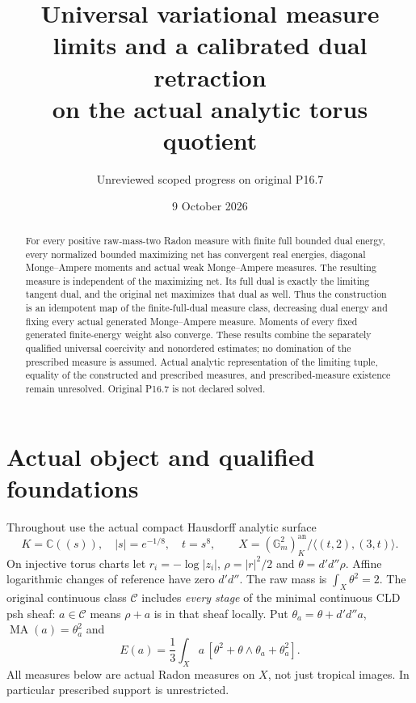 \documentclass[11pt]{article}
\title{Universal variational measure limits and a calibrated dual retraction\\on the actual analytic torus quotient}
\author{Unreviewed scoped progress on original P16.7}
\date{9 October 2026}
\newcommand{\C}{\mathcal C}
\newcommand{\MA}{\operatorname{MA}}
\newcommand{\DD}{d'd''}
\begin{document}
\maketitle
\begin{abstract}
For every positive raw-mass-two Radon measure with finite full bounded
dual energy, every normalized bounded maximizing net has convergent
real energies, diagonal Monge--Ampere moments and actual weak
Monge--Ampere measures. The resulting measure is independent of the
maximizing net. Its full dual is exactly the limiting tangent dual,
and the original net maximizes that dual as well. Thus the construction
is an idempotent map of the finite-full-dual measure class, decreasing
dual energy and fixing every actual generated Monge--Ampere measure.
Moments of every fixed generated finite-energy weight also converge.
These results combine the separately qualified universal coercivity
and nonordered estimates; no domination of the prescribed measure is
assumed. Actual analytic representation of the limiting tuple, equality
of the constructed and prescribed measures, and prescribed-measure
existence remain unresolved. Original P16.7 is not declared solved.
\end{abstract}

\section{Actual object and qualified foundations}
Throughout use the actual compact Hausdorff analytic surface
\[
 K=\mathbb C((s)),\quad |s|=e^{-1/8},\quad t=s^8,
 \qquad X=(\mathbb G_m^2)^{\mathrm{an}}_K/
                  \langle(t,2),(3,t)\rangle.
\]
On injective torus charts let $r_i=-\log|z_i|$,
$\rho=|r|^2/2$ and $\theta=\DD\rho$. Affine logarithmic changes
of reference have zero $\DD$. The raw mass is
$\int_X\theta^2=2$. The original continuous class $\C$ includes
\emph{every stage} of the minimal continuous CLD psh sheaf:
$a\in\C$ means $\rho+a$ is in that sheaf locally.
Put $\theta_a=\theta+\DD a$, $\MA(a)=\theta_a^2$ and
\[
 E(a)=\frac13\int_X a\,[\theta^2+
                   \theta\wedge\theta_a+\theta_a^2].
\]
All measures below are actual Radon measures on $X$, not just
tropical images. In particular prescribed support is unrestricted.
\end{document}
